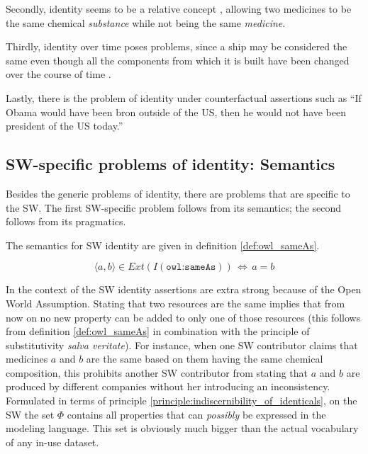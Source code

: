 Secondly, identity seems to be a relative concept \cite{Geach1967},
  allowing two medicines to be the same chemical \emph{substance}
  while not being the same \emph{medicine}.

Thirdly, identity over time poses problems,
  since a ship may be considered the same
  even though all the components from which it is built
  have been changed over the course of time \cite{Lewis1986}.

Lastly, there is the problem of identity under counterfactual assertions
  such as ``If Obama would have been bron outside of the US,
  then he would not have been president of the US today.''\cite{Kripke1980}

\subsection{SW-specific problems of identity: Semantics}

Besides the generic problems of identity,
  there are problems that are specific to the SW.
The first SW-specific problem follows from its semantics;
  the second follows from its pragmatics.

The semantics for SW identity are given in definition \ref{def:owl_sameAs}.

\begin{definition}
\label{def:owl_sameAs}
\begin{equation}
    \langle a, b \rangle \in Ext(I(\texttt{owl:sameAs}))
  \,\iff\,
    a = b\nonumber
\end{equation}
\end{definition}

\noindent In the context of the SW identity assertions are extra strong
  because of the Open World Assumption.
Stating that two resources are the same
  implies that from now on no new property can be added
  to only one of those resources
  (this follows from definition \ref{def:owl_sameAs} in combination with
  the principle of substitutivity \emph{salva veritate}).
For instance, when one SW contributor claims that
  medicines $a$ and $b$ are the same
  based on them having the same chemical composition,
  this prohibits another SW contributor from stating that
  $a$ and $b$ are produced by different companies
  without her introducing an inconsistency.
Formulated in terms of
  principle \ref{principle:indiscernibility_of_identicals},
  on the SW the set $\Phi$ contains
  all properties that can \emph{possibly} be expressed
  in the modeling language.
This set is obviously much bigger than the actual vocabulary
  of any in-use dataset.


